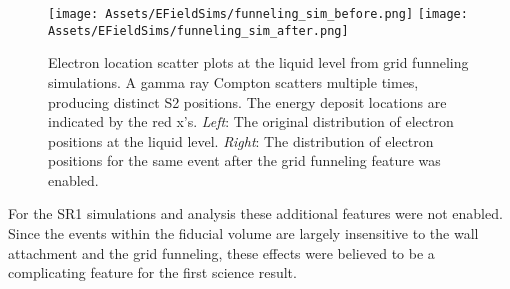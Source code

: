 \begin{figure}
    \centering
    \texttt{[image: Assets/EFieldSims/funneling\_sim\_before.png]}
        \texttt{[image: Assets/EFieldSims/funneling\_sim\_after.png]}

    \caption[Electron location scatter plots at the liquid level from grid funneling simulations. ]%
    {Electron location scatter plots at the liquid level from grid funneling simulations. 
    A gamma ray Compton scatters multiple times, producing distinct S2 positions.
    The energy deposit locations are indicated by the red x's.
    \textit{Left}: The original distribution of electron positions at the liquid level.
    \textit{Right}: The distribution of electron positions for the same event after the grid funneling feature was enabled.}
    \label{fig:funneling_sim}
\end{figure}

For the SR1 simulations and analysis these additional features were not enabled.
Since the events within the fiducial volume are largely insensitive to the wall attachment and the grid funneling, these effects were believed to be a complicating feature for the first science result.
